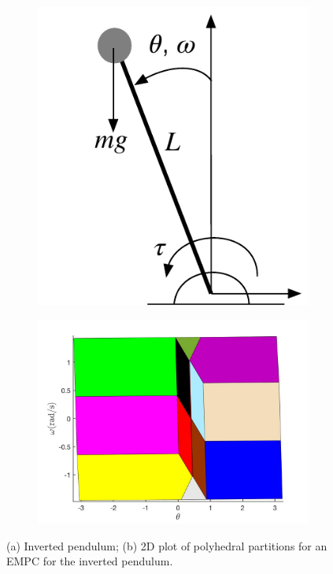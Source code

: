 \begin{figure}[t]
	\centering
  \begin{subfigure}[b]{0.33\columnwidth}
      \includegraphics[width=\textwidth]{Figs/inverted_pendulum.pdf}
      \vspace{0.05cm}
      \caption{}
  \end{subfigure}
  \begin{subfigure}[b]{0.66\columnwidth}
      \includegraphics[width=\textwidth]{Figs/regs.jpg}
      \caption{}
  \end{subfigure}
	\caption{(a) Inverted pendulum; (b) 2D plot of polyhedral partitions for an EMPC for the inverted pendulum.}
	\label{fig:inverted_pendulum}
\end{figure}

